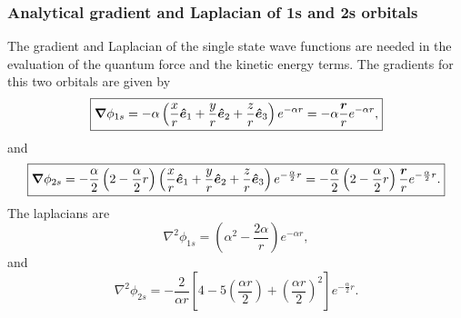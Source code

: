 \subsubsection{Analytical gradient and Laplacian of 1s and 2s orbitals}
The gradient and Laplacian of the single state wave functions are needed in the evaluation of the quantum force and the kinetic energy terms. The gradients for this two orbitals are given by
\begin{equation}
 \boxed{\boldsymbol{\nabla}{\phi_{1s}} = -\alpha \left(\frac{x}{r}\mbox{\boldmath$\hat{e}$\unboldmath}_1 + \frac{y}{r}\mbox{\boldmath$\hat{e}$\unboldmath}_2 + \frac{z}{r}\mbox{\boldmath$\hat{e}$\unboldmath}_3 \right) e^{-\alpha r} = -\alpha \frac{\boldsymbol{r}}{r}e^{-\alpha r},}
\end{equation}
and 
\begin{equation}
 \boxed{\boldsymbol{\nabla}{\phi_{2s}} = -\frac{\alpha}{2}\left(2 - \frac{\alpha}{2} r\right)\left(\frac{x}{r}\mbox{\boldmath$\hat{e}$\unboldmath}_1 + \frac{y}{r}\mbox{\boldmath$\hat{e}$\unboldmath}_2 + \frac{z}{r}\mbox{\boldmath$\hat{e}$\unboldmath}_3 \right)e^{-\frac{\alpha}{2}r} = -\frac{\alpha}{2}\left(2 - \frac{\alpha}{2} r\right)\frac{\boldsymbol{r}}{r} e^{-\frac{\alpha}{2}r}.}
\end{equation}
The laplacians are
\begin{equation}\label{lapPhi1s}
\boxed{\nabla^2 \phi_{1s} =  \left(\alpha^2 - \frac{2 \alpha}{r}\right) e^{- \alpha r},}
\end{equation}
and 
\begin{equation}
 \boxed{\nabla^2 \phi_{2s} = - \frac{2}{\alpha r}\left[4 - 5\left(\frac{\alpha r}{2}\right) + \left(\frac{\alpha r}{2}\right)^2\right]e^{-\frac{\alpha}{2}r}.}
\end{equation}


